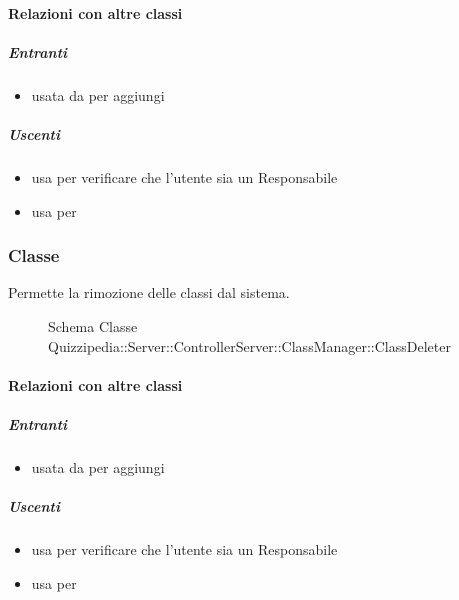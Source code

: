 \paragraph{Relazioni con altre classi}
\subparagraph{Entranti}
\begin{itemize}
\item usata da  per aggiungi
\end{itemize}
\subparagraph{Uscenti}
\begin{itemize}
\item usa  per verificare che l'utente sia un Responsabile
\item usa  per 
\end{itemize}
\subsubsection{Classe }
Permette la rimozione delle classi dal sistema.
\begin{figure}[H]
\centering
\noindent{}
\caption[Schema Classe ClassDeleter]{Schema Classe Quizzipedia::Server::ControllerServer::ClassManager::ClassDeleter}
\end{figure}
\paragraph{Relazioni con altre classi}
\subparagraph{Entranti}
\begin{itemize}
\item usata da  per aggiungi
\end{itemize}
\subparagraph{Uscenti}
\begin{itemize}
\item usa  per verificare che l'utente sia un Responsabile
\item usa  per 
\end{itemize}
